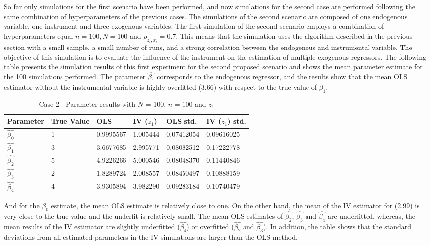 \documentclass{article}
\begin{document}
\newline
So far only simulations for the first scenario have been performed, and now simulations for the second case are performed following the same combination of hyperparameters of the previous cases. The simulations of the second scenario are composed of one endogenous variable, one instrument and three exogenous variables. The first simulation of the second scenario employs a combination of hyperparameters equal $n = 100, N = 100$ and $\rho_{z_{i},x_{i}} = 0.7$. This means that the simulation uses the algorithm described in the previous section with a small sample, a small number of runs, and a strong correlation between the endogenous and instrumental variable. The objective of this simulation is to evaluate the influence of the instrument on the estimation of multiple exogenous regressors.
\newline
The following table presents the simulation results of this first experiment for the second proposed scenario and shows the mean parameter estimate for the 100 simulations performed. The parameter $\hat{\beta_{1}}$ corresponds to the endogenous regressor, and the results show that the mean OLS estimator without the instrumental variable is highly overfitted (3.66) with respect to the true value of $\beta_{1}$. 
\newline
\begin{table}[h!]
\centering
\begin{tabular}{ | m{2cm} | m{2cm}|  m{2cm}| m{2cm}|  m{2cm}| m{2cm}|} 
  \hline
  Parameter & True Value & OLS & IV ($z_{1}$) & OLS std. & IV ($z_{1}$) std.\\ 
  \hline
  $\hat{\beta_{0}}$ & 1 & 0.9995567 & 1.005444 & 0.07412054 & 0.09616025\\ 
  \hline
  $\hat{\beta_{1}}$ & 3 & 3.6677685 & 2.995771 & 0.08082512 & 0.17222778 \\
  \hline
  $\hat{\beta_{2}}$ & 5 & 4.9226266 & 5.000546 & 0.08048370 & 0.11440846 \\
  \hline
  $\hat{\beta_{3}}$ & 2 & 1.8289724 & 2.008557 & 0.08450497 & 0.10888159 \\
  \hline
  $\hat{\beta_{4}}$ & 4 & 3.9305894 & 3.982290 & 0.09283184 & 0.10740479 \\
  \hline
\end{tabular}
\caption{Case 2 - Parameter results with $N$ = 100, $n$ = 100 and $z_{1}$}
\label{table:6}
\end{table}
\newline
And for the $\beta_{0}$ estimate, the mean OLS estimate is relatively close to one. On the other hand, the mean of the IV estimator for (2.99) is very close to the true value and the underfit is relatively small. The mean OLS estimates of $\hat{\beta_{2}}$, $\hat{\beta_{3}}$ and $\hat{\beta_{4}}$ are underfitted, whereas, the mean results of the IV estimator are slightly underfitted ($\hat{\beta_{4}}$) or overfitted ($\hat{\beta_{2}}$ and $\hat{\beta_{3}}$). In addition, the table shows that the standard deviations from all estimated parameters in the IV simulations are larger than the OLS method.
\end{document}
